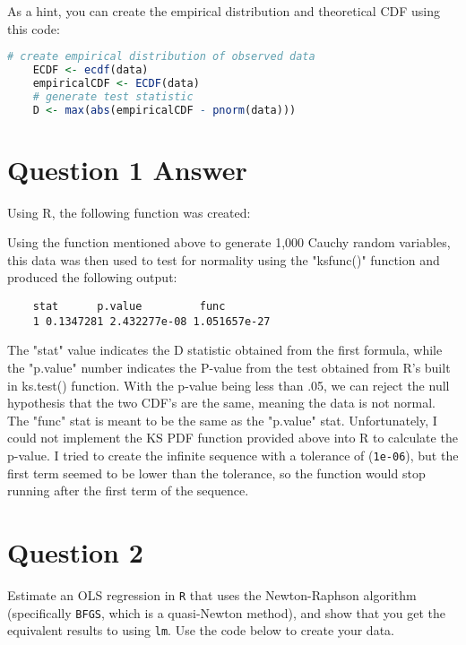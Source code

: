 \documentclass[12pt,letterpaper]{article}
\begin{document}
	
\noindent As a hint, you can create the empirical distribution and theoretical CDF using this code:

\begin{lstlisting}[language=R]
	# create empirical distribution of observed data
	ECDF <- ecdf(data)
	empiricalCDF <- ECDF(data)
	# generate test statistic
	D <- max(abs(empiricalCDF - pnorm(data))) \end{lstlisting}

\vspace{1in}
\section*{Question 1 Answer}
\noindent Using R, the following function was created:

\noindent Using the function mentioned above to generate 1,000  Cauchy random variables, this data was then used to test for normality using the "ksfunc()" function and produced the following output:
 
\begin{verbatim}
	stat      p.value         func
	1 0.1347281 2.432277e-08 1.051657e-27
\end{verbatim}

\noindent The "stat" value indicates the D statistic obtained from the first formula, while the "p.value" number indicates the P-value from the test obtained from R's built in ks.test() function. With the p-value being less than .05, we can reject the null hypothesis that the two CDF's are the same, meaning the data is not normal. \\ 
\noindent The "func" stat is meant to be the same as the "p.value" stat. Unfortunately, I could not implement the KS PDF function provided above into R to calculate the p-value. I tried to create the infinite sequence with a tolerance of (\texttt{1e-06}), but the first term seemed to be lower than the tolerance, so the function would stop running after the first term of the sequence.
	 
\vspace{1in}
\section*{Question 2}
\noindent Estimate an OLS regression in \texttt{R} that uses the Newton-Raphson algorithm (specifically \texttt{BFGS}, which is a quasi-Newton method), and show that you get the equivalent results to using \texttt{lm}. Use the code below to create your data.
\vspace{.5cm}

\end{document}
